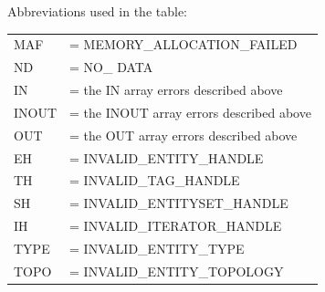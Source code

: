 \documentclass{article}
\begin{document}
Abbreviations used in the table:\\

\begin{tabular}{ll}
MAF  &= MEMORY\_ALLOCATION\_FAILED\\
ND  &= NO\_ DATA\\
IN & = the IN array errors described above\\
INOUT &= the INOUT array errors described above\\
OUT &= the OUT array errors described above\\
EH &= INVALID\_ENTITY\_HANDLE\\
TH &= INVALID\_TAG\_HANDLE\\
SH &= INVALID\_ENTITYSET\_HANDLE\\
IH &= INVALID\_ITERATOR\_HANDLE\\
TYPE &= INVALID\_ENTITY\_TYPE\\
TOPO &= INVALID\_ENTITY\_TOPOLOGY\\
\end{tabular}
\end{document}
